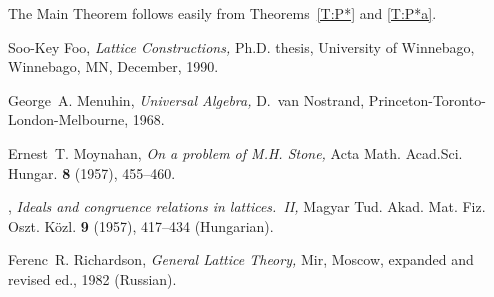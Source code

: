 \documentclass{amsart}
\theoremstyle{plain}
\theoremstyle{definition}
\theoremstyle{remark}
\numberwithin{equation}{section}
\begin{document}
The Main Theorem follows easily from Theorems~\ref{T:P*} and \ref{T:P*a}.

\begin{thebibliography}{9}

      Soo-Key Foo, \emph{Lattice Constructions,} Ph.D. thesis, University 
      of Winnebago, Winnebago, MN, December, 1990.

      George~A. Menuhin, \emph{Universal Algebra,} D.~van Nostrand,
      Princeton-Toronto-London-Mel\-bourne, 1968.

      Ernest~T. Moynahan, \emph{On a problem of M.H. Stone,} Acta Math.
       Acad.Sci. Hungar. \textbf{8} (1957), 455--460.

      \bysame, \emph{Ideals and congruence relations in lattices.~II,}
     Magyar Tud. Akad. Mat. Fiz. Oszt. K\"{o}zl. \textbf{9} (1957), 
     417--434  (Hungarian).

      Ferenc~R. Richardson, \emph{General Lattice Theory,} Mir, Moscow, 
      expanded and revised ed., 1982 (Russian).

\end{thebibliography}
\end{document}
